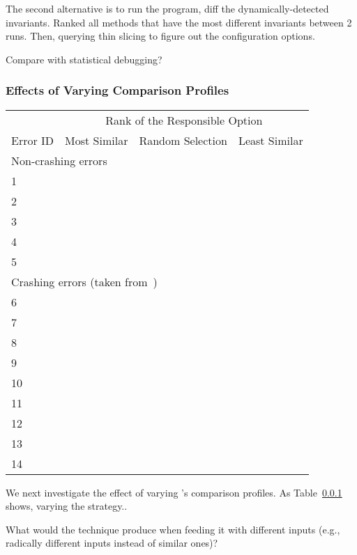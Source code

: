 The second alternative is to run the program, diff the dynamically-detected invariants. Ranked all
methods that have the most different invariants between 2 runs. Then, querying thin slicing to
figure out the configuration options.

Compare with statistical debugging?

\subsubsection{Effects of Varying Comparison Profiles}


\begin{table}[t]
\setlength{\tabcolsep}{.54\tabcolsep}
\begin{tabular}{|l|l|l|l|}
\hline
  & \multicolumn{3}{|c|}{Rank of the Responsible Option } \\
\cline{2-4}
 Error ID & Most Similar& Random Selection& Least Similar\\
 \hline
\hline
\multicolumn{4}{|l|}{Non-crashing errors}   \\
 \hline
 1 & & &\\
 2 & & &\\
 3 & & &\\
 4 & & &\\
 5 & & &\\
\hline
\hline
\multicolumn{4}{|l|}{Crashing errors (taken from~\cite{})}   \\
\hline
 6 & & &\\
 7 & & &\\
 8 & & &\\
 9 & & &\\
 10 & & &\\
 11 & & &\\
 12 & & &\\
 13 & & &\\
 14 & & &\\
\hline
\end{tabular}

\end{table}


We next investigate the effect of varying \ourtool's
comparison profiles. As Table~\ref{} shows, varying the
strategy..


What would the technique produce when feeding it with different inputs (e.g.,
radically different inputs instead of similar ones)?

